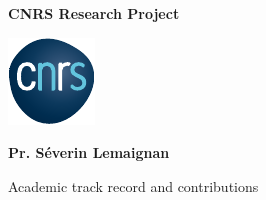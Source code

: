 \documentclass[12pt,a4paper]{article}
\title{\project}
\begin{document}
\begin{center}

    \textbf{\LARGE CNRS Research Project}

    \vspace{1cm}
    \includegraphics[width=0.2\linewidth]{CNRS.pdf}



    \vspace{5cm}
    {\LARGE\bf Pr. Séverin Lemaignan}

    \vspace{3cm}
    {\LARGE Academic track record and contributions}


\end{center}

    \vspace{3cm}

\newpage




\pagebreak
\printbibliography
\end{document}
